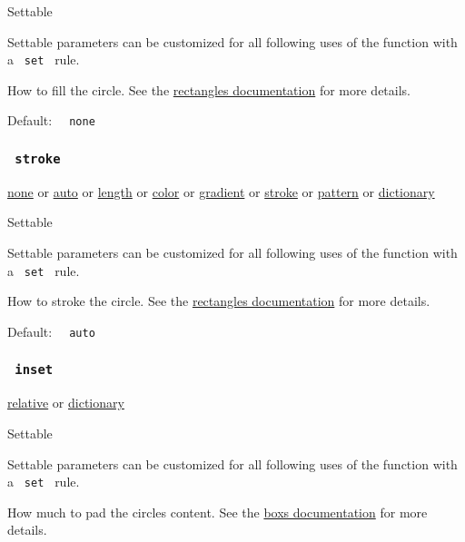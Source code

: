 {{ Settable }}

\label{parameters-fill-settable-tooltip}
Settable parameters can be customized for all following uses of the
function with a \texttt{\ set\ } rule.

How to fill the circle. See the
\href{/docs/reference/visualize/rect/\#parameters-fill}{rectangle\textquotesingle s
documentation} for more details.

Default: \texttt{\ }{\texttt{\ none\ }}\texttt{\ }

\subsubsection{\texorpdfstring{\texttt{\ stroke\ }}{ stroke }}\label{parameters-stroke}

\href{/docs/reference/foundations/none/}{none} {or}
\href{/docs/reference/foundations/auto/}{auto} {or}
\href{/docs/reference/layout/length/}{length} {or}
\href{/docs/reference/visualize/color/}{color} {or}
\href{/docs/reference/visualize/gradient/}{gradient} {or}
\href{/docs/reference/visualize/stroke/}{stroke} {or}
\href{/docs/reference/visualize/pattern/}{pattern} {or}
\href{/docs/reference/foundations/dictionary/}{dictionary}

{{ Settable }}

\label{parameters-stroke-settable-tooltip}
Settable parameters can be customized for all following uses of the
function with a \texttt{\ set\ } rule.

How to stroke the circle. See the
\href{/docs/reference/visualize/rect/\#parameters-stroke}{rectangle\textquotesingle s
documentation} for more details.

Default: \texttt{\ }{\texttt{\ auto\ }}\texttt{\ }

\subsubsection{\texorpdfstring{\texttt{\ inset\ }}{ inset }}\label{parameters-inset}

\href{/docs/reference/layout/relative/}{relative} {or}
\href{/docs/reference/foundations/dictionary/}{dictionary}

{{ Settable }}

\label{parameters-inset-settable-tooltip}
Settable parameters can be customized for all following uses of the
function with a \texttt{\ set\ } rule.

How much to pad the circle\textquotesingle s content. See the
\href{/docs/reference/layout/box/\#parameters-inset}{box\textquotesingle s
documentation} for more details.

